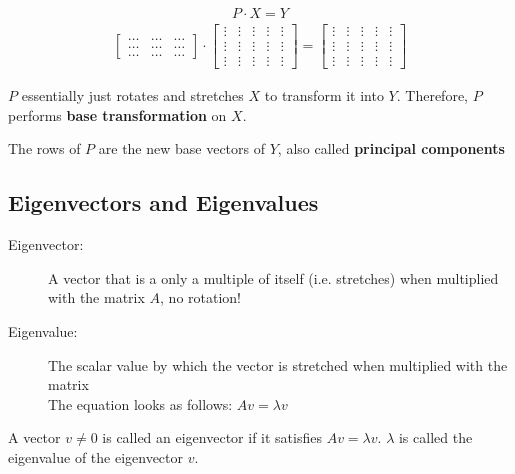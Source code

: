 \documentclass[11pt]{article}
\begin{document}
\begin{align*}
    P \cdot X = Y
\end{align*}
\begin{align*}
    \begin{bmatrix}
        \hdots & \hdots & \hdots \\
        \hdots & \hdots & \hdots \\
        \hdots & \hdots & \hdots
    \end{bmatrix}
    \cdot
    \begin{bmatrix}
        \vdots & \vdots & \vdots & \vdots & \vdots \\
        \vdots & \vdots & \vdots & \vdots & \vdots \\
        \vdots & \vdots & \vdots & \vdots & \vdots
    \end{bmatrix}
    =
    \begin{bmatrix}
        \vdots & \vdots & \vdots & \vdots & \vdots \\
        \vdots & \vdots & \vdots & \vdots & \vdots \\
        \vdots & \vdots & \vdots & \vdots & \vdots
    \end{bmatrix}
\end{align*}

\noindent $P$ essentially just rotates and stretches $X$ to transform it into $Y$. Therefore, $P$ performs \textbf{base transformation} on $X$.

\noindent The rows of $P$ are the new base vectors of $Y$, also called \textbf{principal components}

\subsection{Eigenvectors and Eigenvalues}

\begin{description}
    \item[Eigenvector: ] A vector that is a only a multiple of itself (i.e. stretches) when multiplied with the matrix $A$, no rotation!
    \item[Eigenvalue: ] The scalar value by which the vector is stretched when multiplied with the matrix \\
    The equation looks as follows: $Av = \lambda v$
\end{description}

\noindent A vector $ v \neq 0$ is called an eigenvector if it satisfies $Av = \lambda v$. $\lambda$ is called the eigenvalue of the eigenvector $v$.
\end{document}
